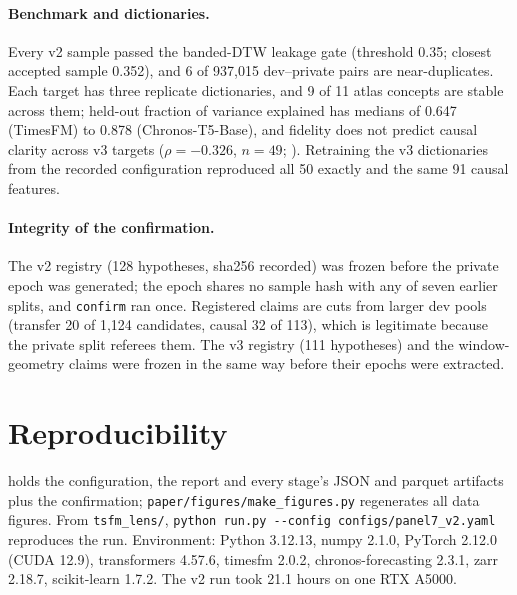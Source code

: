 \paragraph{Benchmark and dictionaries.} Every v2 sample passed the banded-DTW leakage gate (threshold 0.35; closest
accepted sample 0.352), and 6 of 937{,}015 dev--private pairs are near-duplicates. Each target has three replicate
dictionaries, and 9 of 11 atlas concepts are stable across them; held-out fraction of variance explained has medians of
0.647 (TimesFM) to 0.878 (Chronos-T5-Base), and fidelity does not predict causal clarity across v3 targets ($\rho=-0.326$,
$n=49$; ). Retraining the v3 dictionaries from the recorded configuration reproduced all 50 exactly and the
same 91 causal features.

\paragraph{Integrity of the confirmation.} The v2 registry (128 hypotheses, sha256 recorded) was frozen before the
private epoch was generated; the epoch shares no sample hash with any of seven earlier splits, and \texttt{confirm} ran
once. Registered claims are cuts from larger dev pools (transfer 20 of 1{,}124 candidates, causal 32 of 113), which is
legitimate because the private split referees them. The v3 registry (111 hypotheses) and the window-geometry claims were
frozen in the same way before their epochs were extracted.

\section{Reproducibility}
\label{app:repro}

 holds the configuration, the report and every stage's JSON and parquet artifacts plus the
confirmation; \texttt{paper/figures/make\_figures.py} regenerates all data figures. From \texttt{tsfm\_lens/},
\texttt{python run.py -{}-config configs/panel7\_v2.yaml} reproduces the run. Environment: Python 3.12.13, numpy 2.1.0,
PyTorch 2.12.0 (CUDA 12.9), transformers 4.57.6, timesfm 2.0.2, chronos-forecasting 2.3.1, zarr 2.18.7, scikit-learn
1.7.2. The v2 run took 21.1 hours on one RTX A5000.
